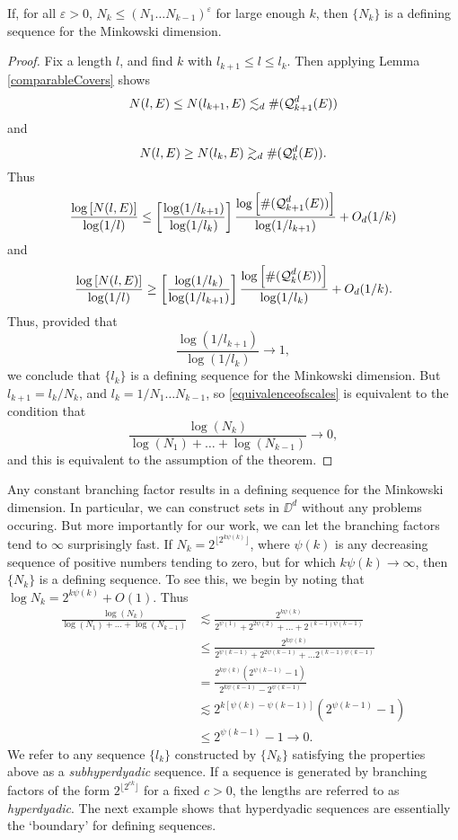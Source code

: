 \begin{lemma} \label{definingsequenceminkowski}
	If, for all $\varepsilon > 0$, $N_k \leq (N_1 \dots N_{k-1})^\varepsilon$ for large enough $k$, then $\{ N_k \}$ is a defining sequence for the Minkowski dimension.
\end{lemma}
\begin{proof}
	Fix a length $l$, and find $k$ with $l_{k+1} \leq l \leq l_k$. Then applying Lemma \ref{comparableCovers} shows
	\[ N(l,E) \leq N(l_{k+1},E) \lesssim_d \#(\operatorname{\mathcal{Q}}_{k+1}^d(E)) \]
	and
	\[ N(l,E) \geq N(l_k,E) \gtrsim_d \#(\operatorname{\mathcal{Q}}_k^d(E)). \]
	Thus
	\[ \frac{\log \left[ N(l,E) \right]}{\log(1/l)} \leq \left[ \frac{\log(1/l_{k+1})}{\log(1/l_k)} \right] \frac{\log \left[ \#(\operatorname{\mathcal{Q}}_{k+1}^d(E)) \right]}{\log(1/l_{k+1})} + O_d(1/k) \]
	and
	\[ \frac{\log \left[ N(l,E) \right]}{\log(1/l)} \geq \left[ \frac{\log(1/l_k)}{\log(1/l_{k+1})} \right] \frac{\log \left[ \#(\operatorname{\mathcal{Q}}_k^d(E)) \right]}{\log(1/l_k)} + O_d(1/k). \]
	Thus, provided that
	\begin{equation} \label{equivalenceofscales}
		\frac{\log(1/l_{k+1})}{\log(1/l_k)} \to 1,
	\end{equation}
	we conclude that $\{ l_k \}$ is a defining sequence for the Minkowski dimension. But $l_{k+1} = l_k/N_k$, and $l_k = 1/N_1 \dots N_{k-1}$, so \eqref{equivalenceofscales} is equivalent to the condition that
	\[ \frac{\log(N_k)}{\log(N_1) + \dots + \log(N_{k-1})} \to 0, \]
	and this is equivalent to the assumption of the theorem.
\end{proof}

Any constant branching factor results in a defining sequence for the Minkowski dimension. In particular, we can construct sets in $\DD^d$ without any problems occuring. But more importantly for our work, we can let the branching factors tend to $\infty$ surprisingly fast. If $N_k = 2^{\lfloor 2^{k \psi(k)} \rfloor}$, where $\psi(k)$ is any decreasing sequence of positive numbers tending to zero, but for which $k \psi(k) \to \infty$, then $\{ N_k \}$ is a defining sequence. To see this, we begin by noting that $\log N_k = 2^{k \psi(k)} + O(1)$. Thus
%
%
\begin{align*}
	\frac{\log(N_k)}{\log(N_1) + \dots + \log(N_{k-1})} &\lesssim \frac{2^{k \psi(k)}}{2^{\psi(1)} + 2^{2 \psi(2)} + \dots + 2^{(k-1) \psi(k-1)}}\\
	&\leq \frac{2^{k \psi(k)}}{2^{\psi(k-1)} + 2^{2 \psi(k-1)} + \dots 2^{(k-1) \psi(k-1)}}\\
	&= \frac{2^{k \psi(k)} ( 2^{\psi(k-1)} - 1 )}{2^{k \psi(k-1)} - 2^{\psi(k-1)}} \\
	&\lesssim 2^{k[\psi(k) - \psi(k-1)]} (2^{\psi(k-1)} - 1)\\
	&\leq 2^{\psi(k-1)} - 1 \to 0.
\end{align*}
%
We refer to any sequence $\{ l_k \}$ constructed by $\{ N_k \}$ satisfying the properties above as a \emph{subhyperdyadic} sequence. If a sequence is generated by branching factors of the form $2^{\lfloor 2^{ck} \rfloor}$ for a fixed $c > 0$, the lengths are referred to as \emph{hyperdyadic}. The next example shows that hyperdyadic sequences are essentially the `boundary' for defining sequences.

